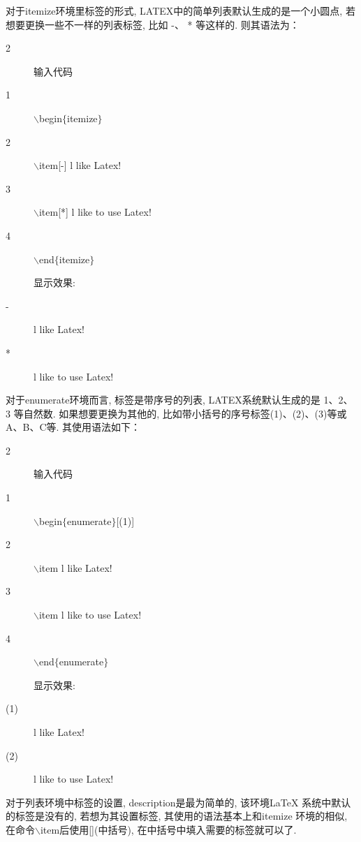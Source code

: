 对于itemize环境里标签的形式, LATEX中的简单列表默认生成的是一个小圆点, 若想要更换一些不一样的列表标签,  比如 -、 * 等这样的. 则其语法为：
 \begin{multicols}{2}
\begin{description}
    \item[] 输入代码
  \item[1]$\backslash$begin$\{$itemize$\}$
  \item[2]$\backslash$item[-] l like Latex!
  \item[3]$\backslash$item[*] l like to use Latex!
  \item[4]$\backslash$end$\{$itemize$\}$
    \item[]显示效果:
\item[-] l like Latex!
\item[*] l like to use Latex!
\item[]
\item[]
\end{description}
\end{multicols}
对于enumerate环境而言, 标签是带序号的列表, LATEX系统默认生成的是 1、2、3 等自然数. 如果想要更换为其他的, 比如带小括号的序号标签(1)、(2)、(3)等或A、B、C等. 其使用语法如下：
 \begin{multicols}{2}
\begin{description}
    \item[]输入代码
  \item[1]$\backslash$begin$\{$enumerate$\}$[(1)]
  \item[2]$\backslash$item l like Latex!
  \item[3]$\backslash$item l like to use Latex!
  \item[4]$\backslash$end$\{$enumerate$\}$
    \item[]显示效果:
\item[(1)] l like Latex!
\item[(2)] l like to use Latex!
\item[]
\item[]
\end{description}
\end{multicols}
对于列表环境中标签的设置, description是最为简单的, 该环境\LaTeX{} 系统中默认的标签是没有的, 若想为其设置标签, 其使用的语法基本上和itemize 环境的相似, 在命令$\backslash$item后使用[](中括号), 在中括号中填入需要的标签就可以了.

